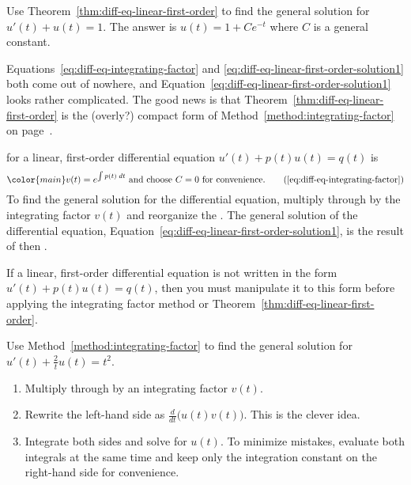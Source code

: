\documentclass[../main.tex]{subfiles}
\begin{document}
\begin{example}
  Use Theorem~\ref{thm:diff-eq-linear-first-order} to find the general solution for \(u'(t) + u(t) = 1\).
  {\footnotesize The answer is \(u(t) = 1 + C e^{-t}\) where \(C\) is a general constant.}
\end{example}

\faStar{} Equations~\eqref{eq:diff-eq-integrating-factor} and \eqref{eq:diff-eq-linear-first-order-solution1} both come out of nowhere, and Equation~\eqref{eq:diff-eq-linear-first-order-solution1} looks rather complicated. The good news is that Theorem~\ref{thm:diff-eq-linear-first-order} is the (overly?) compact form of Method~\ref{method:integrating-factor} on page~\pageref{method:integrating-factor}.

\clearpage

\begin{method} \label{method:integrating-factor}
   for a linear, first-order differential equation \(u'(t) + p(t) u(t) = q(t)\) is
  \begin{equation} 
    \color{main}
    v(t) = e^{\int p(t) \;dt} \text{ and choose \(C = 0\) for convenience}. \tag{\ref{eq:diff-eq-integrating-factor}}
  \end{equation}
  To find the general solution for the differential equation, multiply through by the integrating factor \(v(t)\) and reorganize the . The general solution of the differential equation, Equation~\eqref{eq:diff-eq-linear-first-order-solution1}, is the result of  then .
\end{method}

\faExclamationTriangle{} If a linear, first-order differential equation is not written in the form \(u'(t) + p(t) u(t) = q(t)\), then you must manipulate it to this form before applying the integrating factor method or Theorem~\ref{thm:diff-eq-linear-first-order}.

\begin{example} \label{ex:diff-eq-linear-first-order-1}
  Use Method~\ref{method:integrating-factor} to find the general solution for \( u'(t) + \tfrac{2}{t} u(t) = t^{2}\).
  
  \begin{enumerate}[wide, label=(Step~\arabic*)]
    \item Multiply through by an integrating factor \(v(t)\).

    \item Rewrite the left-hand side as \(\frac{d}{dt} \bigg( u(t) v(t) \bigg)\).  This is the clever idea.
      
    \item Integrate both sides and solve for \(u(t)\). \faExclamationTriangle{} To minimize mistakes, evaluate both integrals at the same time and keep only the integration constant on the right-hand side for convenience. 
  \end{enumerate}
\end{example}
\clearpage
\end{document}
